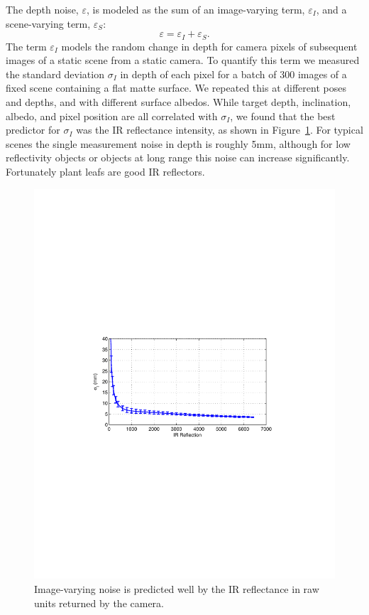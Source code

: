 The depth noise, $\varepsilon$, is modeled as the sum of an image-varying term, $\varepsilon_I$, and a scene-varying term, $\varepsilon_S$:
\begin{equation}
\varepsilon = \varepsilon_I + \varepsilon_S. \label{eq:epsilon}
\end{equation}
The term $\varepsilon_I$ models the random change in depth for camera pixels of subsequent images of a static scene from a static camera.  To quantify this term we measured the standard deviation $\sigma_I$ in depth of each pixel for a batch of 300 images of a fixed scene containing a flat matte surface.  We repeated this at different poses and depths, and with different surface albedos.  While target depth, inclination, albedo, and pixel position are all correlated with $\sigma_I$, we found that the best predictor for $\sigma_I$ was the IR reflectance intensity, as shown in Figure~\ref{fig:sigmainterframe}.  For typical scenes the single measurement noise in depth is roughly 5mm, although for low reflectivity objects or objects at long range this noise can increase significantly.  Fortunately plant leafs are good IR reflectors.

\begin{figure}
\begin{center}
   \includegraphics[trim=120 280 110 290,clip,width=0.9\linewidth]{Figures/SigmaInterframe}
\end{center}
   \caption{Image-varying noise is predicted well by the IR reflectance in raw units returned by the camera.}
\label{fig:sigmainterframe}
\end{figure}


